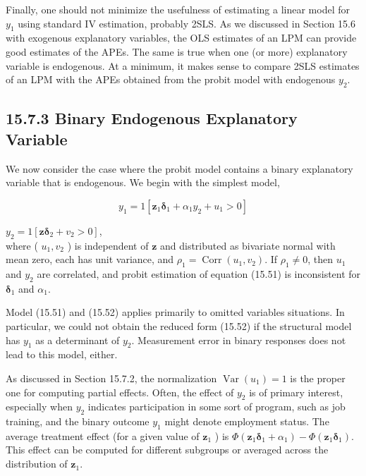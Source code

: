\documentclass[10pt]{article}
\begin{document}
Finally, one should not minimize the usefulness of estimating a linear model for $y_{1}$ using standard IV estimation, probably 2SLS. As we discussed in Section 15.6 with exogenous explanatory variables, the OLS estimates of an LPM can provide good estimates of the APEs. The same is true when one (or more) explanatory variable is endogenous. At a minimum, it makes sense to compare 2SLS estimates of an LPM with the APEs obtained from the probit model with endogenous $y_{2}$.

\subsection*{15.7.3 Binary Endogenous Explanatory Variable}
We now consider the case where the probit model contains a binary explanatory variable that is endogenous. We begin with the simplest model,


\begin{equation*}
y_{1}=1\left[\mathbf{z}_{1} \boldsymbol{\delta}_{1}+\alpha_{1} y_{2}+u_{1}>0\right] \tag{15.51}
\end{equation*}


$y_{2}=1\left[\mathbf{z} \boldsymbol{\delta}_{2}+v_{2}>0\right]$,\\
where ( $u_{1}, v_{2}$ ) is independent of $\mathbf{z}$ and distributed as bivariate normal with mean zero, each has unit variance, and $\rho_{1}=\operatorname{Corr}\left(u_{1}, v_{2}\right)$. If $\rho_{1} \neq 0$, then $u_{1}$ and $y_{2}$ are correlated, and probit estimation of equation (15.51) is inconsistent for $\boldsymbol{\delta}_{1}$ and $\alpha_{1}$.

Model (15.51) and (15.52) applies primarily to omitted variables situations. In particular, we could not obtain the reduced form (15.52) if the structural model has $y_{1}$ as a determinant of $y_{2}$. Measurement error in binary responses does not lead to this model, either.

As discussed in Section 15.7.2, the normalization $\operatorname{Var}\left(u_{1}\right)=1$ is the proper one for computing partial effects. Often, the effect of $y_{2}$ is of primary interest, especially when $y_{2}$ indicates participation in some sort of program, such as job training, and the binary outcome $y_{1}$ might denote employment status. The average treatment effect (for a given value of $\mathbf{z}_{1}$ ) is $\Phi\left(\mathbf{z}_{1} \boldsymbol{\delta}_{1}+\alpha_{1}\right)-\Phi\left(\mathbf{z}_{1} \boldsymbol{\delta}_{1}\right)$. This effect can be computed for different subgroups or averaged across the distribution of $\mathbf{z}_{1}$.
\end{document}
